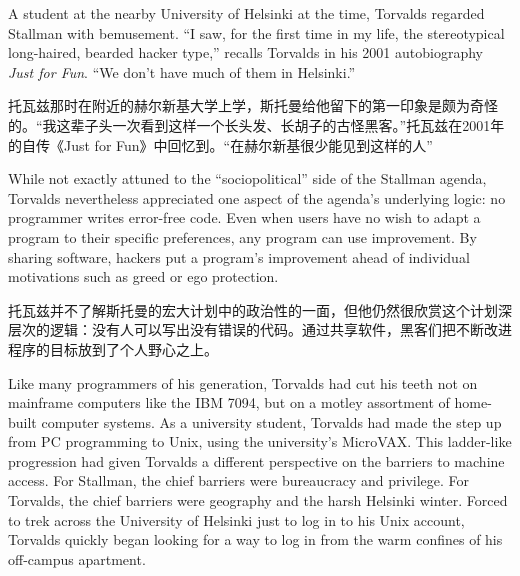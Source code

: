 \ifdefined\eng
A student at the nearby University of Helsinki at the time, Torvalds regarded Stallman with bemusement. ``I saw, for the first time in my life, the stereotypical long-haired, bearded hacker type,'' recalls Torvalds in his 2001 autobiography \textit{Just for Fun}. ``We don't have much of them in Helsinki.''
\fi

\ifdefined\chs
托瓦兹那时在附近的赫尔新基大学上学，斯托曼给他留下的第一印象是颇为奇怪的。“我这辈子头一次看到这样一个长头发、长胡子的古怪黑客。”托瓦兹在2001年的自传《Just for Fun》中回忆到。“在赫尔新基很少能见到这样的人”
\fi

\ifdefined\eng
While not exactly attuned to the ``sociopolitical'' side of the Stallman agenda, Torvalds nevertheless appreciated one aspect of the agenda's underlying logic: no programmer writes error-free code. Even when users have no wish to adapt a program to their specific preferences, any program can use improvement. By sharing software, hackers put a program's improvement ahead of individual motivations such as greed or ego protection.
\fi

\ifdefined\chs
托瓦兹并不了解斯托曼的宏大计划中的政治性的一面，但他仍然很欣赏这个计划深层次的逻辑：没有人可以写出没有错误的代码。通过共享软件，黑客们把不断改进程序的目标放到了个人野心之上。
\fi

\ifdefined\eng
Like many programmers of his generation, Torvalds had cut his teeth not on mainframe computers like the IBM 7094, but on a motley assortment of home-built computer systems. As a university student, Torvalds had made the step up from PC programming to Unix, using the university's MicroVAX. This ladder-like progression had given Torvalds a different perspective on the barriers to machine access. For Stallman, the chief barriers were bureaucracy and privilege. For Torvalds, the chief barriers were geography and the harsh Helsinki winter. Forced to trek across the University of Helsinki just to log in to his Unix account, Torvalds quickly began looking for a way to log in from the warm confines of his off-campus apartment.
\fi

